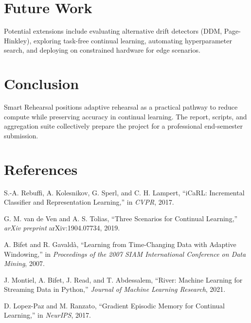 \documentclass[12pt,a4paper]{article}
\begin{document}
\section{Future Work}
Potential extensions include evaluating alternative drift detectors (DDM, Page-Hinkley), exploring task-free continual learning, automating hyperparameter search, and deploying on constrained hardware for edge scenarios.

\section{Conclusion}
Smart Rehearsal positions adaptive rehearsal as a practical pathway to reduce compute while preserving accuracy in continual learning. The report, scripts, and aggregation suite collectively prepare the project for a professional end-semester submission.

\section*{References}
\begin{thebibliography}{9}
S.-A. Rebuffi, A. Kolesnikov, G. Sperl, and C. H. Lampert, ``iCaRL: Incremental Classifier and Representation Learning,'' in \emph{CVPR}, 2017.

G. M. van de Ven and A. S. Tolias, ``Three Scenarios for Continual Learning,'' \emph{arXiv preprint} arXiv:1904.07734, 2019.

A. Bifet and R. Gavaldà, ``Learning from Time-Changing Data with Adaptive Windowing,'' in \emph{Proceedings of the 2007 SIAM International Conference on Data Mining}, 2007.

J. Montiel, A. Bifet, J. Read, and T. Abdessalem, ``River: Machine Learning for Streaming Data in Python,'' \emph{Journal of Machine Learning Research}, 2021.

D. Lopez-Paz and M. Ranzato, ``Gradient Episodic Memory for Continual Learning,'' in \emph{NeurIPS}, 2017.
\end{thebibliography}
\end{document}
